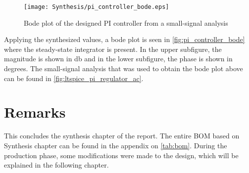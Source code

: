 \begin{figure}[htbp]
	\centering
	\texttt{[image: Synthesis/pi\_controller\_bode.eps]}
	\caption{Bode plot of the designed PI controller from a small-signal analysis}
	\label{fig:pi_controller_bode}
\end{figure}

Applying the synthesized values, a bode plot is seen in \autoref{fig:pi_controller_bode} where the steady-state integrator is present. In the upper subfigure, the magnitude is shown in \si{\decibel} and in the lower subfigure, the phase is shown in degrees. The small-signal analysis that was used to obtain the bode plot above can be found in \autoref{fig:ltspice_pi_regulator_ac}.

\section{Remarks}
This concludes the synthesis chapter of the report. The entire BOM based on Synthesis chapter can be found in the appendix on \autoref{tab:bom}. During the production phase, some modifications were made to the design, which will be explained in the following chapter.